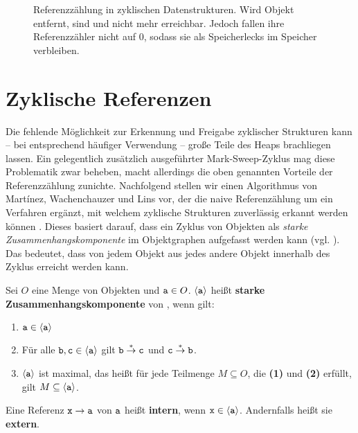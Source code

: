 \begin{figure}[h]
	\centering
	
	\caption[Referenzzählung in zyklischen Datenstrukturen]{Referenzzählung in zyklischen Datenstrukturen. Wird Objekt  entfernt, sind  und  nicht mehr erreichbar. Jedoch fallen ihre Referenzzähler nicht auf $0$, sodass sie als Speicherlecks im Speicher verbleiben.}
	\label{fig:rc-cycle}
\end{figure}

\section{Zyklische Referenzen}
\label{sec:cyclic-rc}
Die fehlende Möglichkeit zur Erkennung und Freigabe zyklischer Strukturen kann -- bei entsprechend häufiger Verwendung -- große Teile des Heaps brachliegen lassen.
Ein gelegentlich zusätzlich ausgeführter Mark-Sweep-Zyklus mag diese Problematik zwar beheben, macht allerdings die oben genannten Vorteile der Referenzzählung zunichte.
Nachfolgend stellen wir einen Algorithmus von Martínez, Wachenchauzer und Lins vor, der die naive Referenzählung um ein Verfahren ergänzt, mit welchem zyklische Strukturen zuverlässig erkannt werden können \cite{martinez1990}.
Dieses basiert darauf, dass ein Zyklus von Objekten als \textit{starke Zusammenhangskomponente} im Objektgraphen aufgefasst werden kann (vgl. \cite[S. 348]{linhou2006}).
Das bedeutet, dass von jedem Objekt aus jedes andere Objekt innerhalb des Zyklus erreicht werden kann.

\begin{mybox}
\begin{defn}
\label{def:zusammenhang}
	Sei $O$ eine Menge von Objekten und $\texttt{a} \in O$.
	$\left\langle\texttt{a}\right\rangle$ heißt \textbf{starke Zusammenhangskomponente} von , wenn gilt:\footnotemark
	\begin{enumerate}[(1)]
		\item $\texttt{a} \in \left\langle\texttt{a}\right\rangle$
		\item Für alle $\texttt{b}, \texttt{c} \in \left\langle\texttt{a}\right\rangle$ gilt $\texttt{b} \overset{*}{\rightarrow} \texttt{c}$ und $\texttt{c} \overset{*}{\rightarrow} \texttt{b}$.
		\item $\left\langle\texttt{a}\right\rangle$ ist maximal, das heißt für jede Teilmenge $M \subseteq O$, die \textbf{(1)} und \textbf{(2)} erfüllt, gilt $M \subseteq \left\langle\texttt{a}\right\rangle$.
	\end{enumerate}
	Eine Referenz $\texttt{x} \rightarrow \texttt{a}$ von $\texttt{a}$ heißt \textbf{intern}, wenn $\texttt{x} \in \left\langle\texttt{a}\right\rangle$.
	Andernfalls heißt sie \textbf{extern}.	
\end{defn}
\end{mybox}

